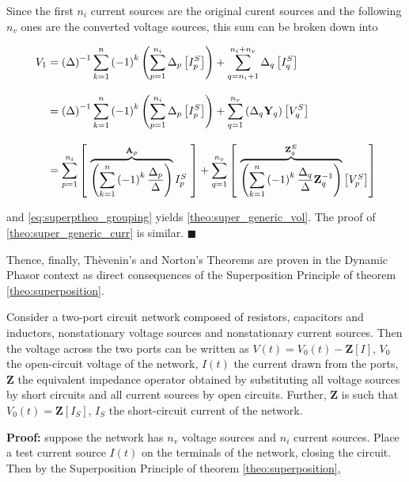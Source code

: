 	Since the first $n_i$ current sources are the original curent sources and the following $n_v$ ones are the converted voltage sources, this sum can be broken down into

\begin{align}
	V_1 &= \left(\Delta\right)^{-1} \sum_{k=1}^n \left(-1\right)^k \left(\sum_{p=1}^{n_i} \Delta_{p} \left[I^S_{p}\right]\right) + \sum_{q=n_i+1}^{n_i + n_v} \Delta_{q} \left[I^S_q \right] \nonumber\\[3mm]
	    &= \left(\Delta\right)^{-1} \sum_{k=1}^n \left(-1\right)^k \left(\sum_{p=1}^{n_i} \Delta_{p} \left[I^S_{p}\right]\right) + \sum_{q=1}^{n_v}           \left(\Delta_{q} \mathbf{Y}_{q}\right)\left[ V^S_q\right] \nonumber\\[3mm]
	    &= \sum_{p=1}^{n_i}\left[ \raisebox{-3mm}{ $\overbrace{\left(\sum_{k=1}^n \left(-1\right)^k \dfrac{\Delta_p}{\Delta} \right)}^{\mathbf{A}_p} I^S_{p} $ }\right] + \sum_{q=1}^{n_v}\left[ \raisebox{-3mm}{ $\overbrace{\left( \sum_{k=1}^n \left(-1\right)^k \dfrac{\Delta_q}{\Delta}\mathbf{Z}^{-1}_q \right)}^{\mathbf{Z}_q^E} \left[V^S_{p}\right] $}\right] \label{eq:superptheo_grouping}
\end{align}

	and \eqref{eq:superptheo_grouping} yields \eqref{theo:super_generic_vol}. The proof of \eqref{theo:super_generic_curr} is similar. \hfill$\blacksquare$

	Thence, finally, Thèvenin's and Norton's Theorems are proven in the Dynamic Phasor context as direct consequences of the Superposition Principle of theorem \ref{theo:superposition}.

\begin{theorem} \label{theo:thevenin} %
Consider a two-port circuit network composed of resistors, capacitors and inductors, nonstationary voltage sources and nonstationary current sources. Then the voltage across the two ports can be written as $V(t) = V_0(t) - \mathbf{Z}\left[I\right]$, $V_0$ the open-circuit voltage of the network, $I(t)$ the current drawn from the ports, $\mathbf{Z}$ the equivalent impedance operator obtained by substituting all voltage sources by short circuits and all current sources by open circuits. Further, $\mathbf{Z}$ is such that $V_0(t) = \mathbf{Z}\left[I_S\right]$, $I_S$ the short-circuit current of the network.
\end{theorem}
\textbf{Proof:} suppose the network has $n_v$ voltage sources and $n_i$ current sources. Place a test current source $I(t)$ on the terminals of the network, closing the circuit. Then by the Superposition Principle of theorem \ref{theo:superposition},

